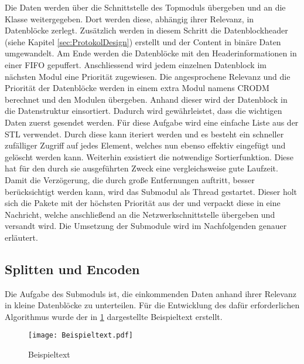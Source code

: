 Die Daten werden {\"u}ber die Schnittstelle des Topmoduls {\"u}bergeben und an die
Klasse  weitergegeben. Dort werden diese, abh{\"a}ngig
ihrer Relevanz, in Datenbl{\"o}cke zerlegt. Zus{\"a}tzlich werden in diesem
Schritt die Datenblockheader (siehe Kapitel \ref{sec:ProtokolDesign}) erstellt und der
Content in bin{\"a}re Daten umgewandelt. Am Ende werden die Datenbl{\"o}cke mit den
Headerinformationen in einer \gls{FIFO} gepuffert.
Anschliessend wird jedem einzelnen Datenblock im n{\"a}chsten Modul eine Priorit{\"a}t zugewiesen. Die angesprochene
Relevanz und die Priorit{\"a}t der Datenbl{\"o}cke werden in einem extra Modul namens
\gls{CRODM} berechnet und den Modulen {\"u}bergeben.
Anhand dieser wird der Datenblock in die Datenstruktur
 einsortiert. Dadurch wird
gew{\"a}hrleistet, dass die wichtigen Daten zuerst gesendet werden. F{\"u}r diese
Aufgabe wird eine einfache Liste aus der \gls{STL} verwendet. Durch diese kann
iteriert werden und es besteht ein schneller zufälliger Zugriff auf jedes
Element, welches nun ebenso effektiv eingefügt und gelöscht werden kann.
Weiterhin exsistiert die notwendige Sortierfunktion. Diese hat f{\"u}r den durch sie
ausgef{\"u}hrten Zweck eine vergleichsweise gute Laufzeit.
Damit die Verz{\"o}gerung, die durch gro{\ss}e Entfernungen auftritt, besser
ber{\"u}cksichtigt werden kann, wird das Submodul  als Thread
gestartet.
Dieser holt sich die Pakete mit der h{\"o}chsten Priorit{\"a}t aus der
 und verpackt diese in eine Nachricht, welche
anschlie{\ss}end an die Netzwerkschnittstelle {\"u}bergeben und versandt wird.
\newline Die Umsetzung der Submodule wird im Nachfolgenden genauer
erl{\"a}utert.

\subsection{Splitten und Encoden}

Die Aufgabe des Submoduls  ist, die einkommenden Daten
anhand ihrer Relevanz in kleine Datenbl{\"o}cke zu unterteilen. F{\"u}r die Entwicklung
des daf{\"u}r erforderlichen Algorithmus wurde der in \ref{fig:Beispieltext}
dargestellte Beispieltext erstellt.

\begin{figure}[H]
	\centering
	\texttt{[image: Beispieltext.pdf]}
	\caption{Beispieltext}
	\label{fig:Beispieltext}
\end{figure}

